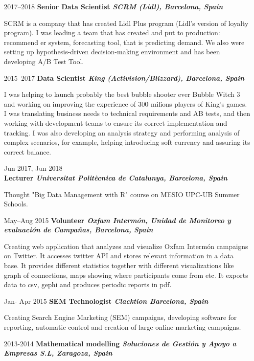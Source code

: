 \documentclass{article}
\begin{document}
\begin{CV}
\item[2017--2018] {\bf Senior Data Scientist \it SCRM (Lidl), Barcelona, Spain}

  SCRM is a company that has created Lidl Plus program (Lidl's version of loyalty program). I was
  leading a team that has created and put to production: recommend er system, forecasting tool,
  that is predicting demand.  We also were setting up hypothesis-driven decision-making environment
  and has been developing A/B Test Tool.

\item[2015--2017] {\bf Data Scientist \it King (Activision/Blizzard), Barcelona, Spain}

  I was helping to launch probably the best bubble shooter ever Bubble Witch 3 and working on
  improving the experience of 300 milions players of King's games. I was translating business needs
  to technical requirements and AB tests, and then working with development teams to ensure its
  correct implementation and tracking. I was also developing an analysis strategy and performing
  analysis of complex scenarios, for example, helping introducing soft currency and assuring its
  correct balance.

\item[Jun 2017, Jun 2018] {\ \\ \bf Lecturer \it Universitat Politècnica de Catalunya, Barcelona, Spain}

  Thought "Big Data Management with R" course on MESIO UPC-UB Summer Schools.

\item[May--Aug 2015] {\bf Volunteer \it Oxfam Intermón, Unidad de
    Monitoreo y evaluación de Campañas, Barcelona, Spain}

  Creating web application that analyzes and visualize Oxfam Intermón
  campaigns on Twitter. It accesses twitter API and stores relevant
  information in a data base. It provides different
  statistics together with different
  visualizations like graph of connections, maps showing
  where participants come from etc. It exports data to csv, gephi and
  produces periodic reports in pdf.  
  
\item[Jan- Apr 2015] {\bf SEM Technologist \it Clacktion
    Barcelona, Spain}

  Creating Search Engine Marketing (SEM) campaigns, developing
  software for reporting, automatic control and creation of large
  online marketing campaigns.
  

\item[2013-2014] {\bf Mathematical modelling \it Soluciones de Gestión y Apoyo a Empresas S.L,
    Zaragoza, Spain}


\end{CV}
\end{document}

